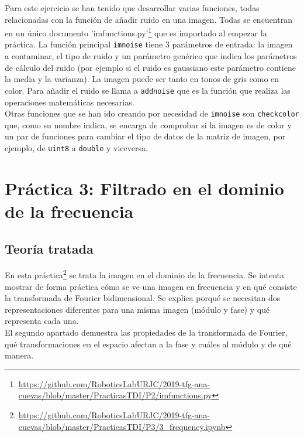 Para este ejercicio se han tenido que desarrollar varias funciones, todas relacionadas con la función de añadir ruido en una imagen. Todas se encuentran en un único documento 'imfunctions.py'\footnote{\url{https://github.com/RoboticsLabURJC/2019-tfg-ana-cuevas/blob/master/PracticasTDI/P2/imfunctions.py}} que es importado al empezar la práctica. La función principal \texttt{imnoise} tiene 3 parámetros de entrada: la imagen a contaminar, el tipo de ruido y un parámetro genérico que indica los parámetros de cálculo del ruido (por ejemplo si el ruido es gaussiano este parámetro contiene la media y la varianza). La imagen puede ser tanto en tonos de gris como en color. Para añadir el ruido se llama a \texttt{addnoise} que es la función que realiza las operaciones matemáticas necesarias.\\

Otras funciones que se han ido creando por necesidad de \texttt{imnoise} son \texttt{checkcolor} que, como su nombre indica, se encarga de comprobar si la imagen es de color y un par de funciones para cambiar el tipo de datos de la matriz de imagen, por ejemplo, de \texttt{uint8} a \texttt{double} y viceversa.

\section{Práctica 3: Filtrado en el dominio de la frecuencia}
\subsection{Teoría tratada}

En esta práctica\footnote{\url{https://github.com/RoboticsLabURJC/2019-tfg-ana-cuevas/blob/master/PracticasTDI/P3/3_frequency.ipynb}} se trata la imagen en el dominio de la frecuencia. Se intenta mostrar de forma práctica cómo se ve una imagen en frecuencia y en qué consiste la transformada de Fourier bidimensional. Se explica porqué se necesitan dos representaciones diferentes para una misma imagen (módulo y fase) y qué representa cada una.\\

El segundo apartado demuestra las propiedades de la transformada de Fourier, qué transformaciones en el espacio afectan a la fase y cuáles al módulo y de qué manera.\\

